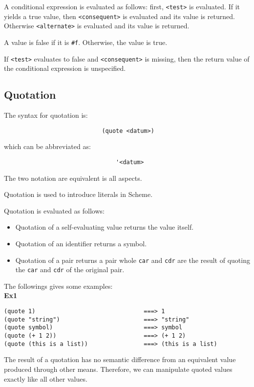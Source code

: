 \documentclass{article}
\begin{document}
A conditional expression is evaluated as follows: first, \texttt{<test>} is evaluated. If it yields a true value, then \texttt{<consequent>} is evaluated and its value is returned. Otherwise \texttt{<alternate>} is evaluated and its value is returned.

A value is false if it is \texttt{\#f}. Otherwise, the value is true.

If \texttt{<test>} evaluates to false and \texttt{<consequent>} is missing, then the return value of the conditional expression is unspecified.

\subsection*{Quotation}
The syntax for quotation is:
\begin{lstlisting}
                            (quote <datum>)
\end{lstlisting}
which can be abbreviated as:
\begin{lstlisting}
                                '<datum>
\end{lstlisting}
The two notation are equivalent is all aspects.

Quotation is used to introduce literals in Scheme.

Quotation is evaluated as follows:

\begin{itemize}
\item Quotation of a self-evaluating value returns the value itself.
\item Quotation of an identifier returns a symbol.
\item Quotation of a pair returns a pair whole \texttt{car} and \texttt{cdr} are the result of quoting the \texttt{car} and \texttt{cdr} of the original pair.
\end{itemize}

The followings gives some examples:\\

\textbf{Ex1}
\begin{lstlisting}
(quote 1)                               ===> 1
(quote "string")                        ===> "string"
(quote symbol)                          ===> symbol
(quote (+ 1 2))                         ===> (+ 1 2)
(quote (this is a list))                ===> (this is a list)
\end{lstlisting}

The result of a quotation has no semantic difference from an equivalent value produced through other means. Therefore, we can manipulate quoted values exactly like all other values.
\end{document}
